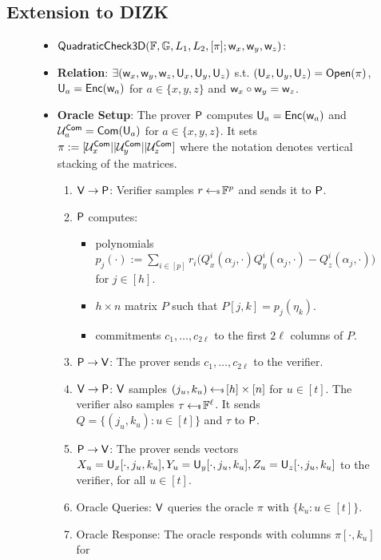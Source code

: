 \subsection{Extension to DIZK}


\begin{figure}[h!]
\centering
\begin{framed}
\begin{itemize}
\item $\mathsf{QuadraticCheck3D}(\mathbb{F},\mathbb{G},L_1,L_2,[\pi];\mathsf{w}_x,\mathsf{w}_y,\mathsf{w}_z)$:
\item {\bf Relation}: $\exists (\mathsf{w}_x,\mathsf{w}_y,\mathsf{w}_z,\mathsf{U}_x,\mathsf{U}_y,\mathsf{U}_z)$
s.t. $(\mathsf{U}_x,\mathsf{U}_y,\mathsf{U}_z)=\mathsf{Open}(\pi)$, $\mathsf{U}_{a}=\mathsf{Enc}(\mathsf{w}_a)$ for $a\in
\{x,y,z\}$ and $\mathsf{w}_x\circ \mathsf{w}_y = \mathsf{w}_z$.
\item {\bf Oracle Setup}: The prover $\mathsf{P}$ computes $\mathsf{U}_a=\mathsf{Enc}(\mathsf{w}_a)$
and $\mathcal{U}^{\mathsf{Com}}_a=\mathsf{Com}(\mathsf{U}_a)$ for $a\in \{x,y,z\}$. It sets $\pi :=
[\mathcal{U}^{\mathsf{Com}}_x||\mathcal{U}^{\mathsf{Com}}_y||\mathcal{U}^{\mathsf{Com}}_z]$ where the notation denotes vertical
stacking of the matrices. 
\begin{enumerate}[{\rm 1.}]
\item $\mathsf{V}\rightarrow\mathsf{P}$: Verifier samples $r\hskip2.3pt{\gets\!\!\mbox{\tiny${\$}$\normalsize}}\,\mathbb{F}^p$ and sends
it to $\mathsf{P}$.
\item $\mathsf{P}$ computes:
	\begin{itemize}
	\item polynomials $p_j(\cdot):=\sum_{i\in
[p]}r_i\big(Q^i_x(\alpha_j,\cdot)Q^i_y(\alpha_j,\cdot)-Q^i_z(\alpha_j,\cdot)\big)$
for $j\in [h]$.
	\item $h\times n$ matrix $P$ such that $P[j,k]=p_j(\eta_k)$.
	\item commitments $c_1,\ldots,c_{2\ell}$ to the first $2\ell$ columns of
$P$.
	\end{itemize}
\item $\mathsf{P}\rightarrow\mathsf{V}$: The prover sends $c_1,\ldots,c_{2\ell}$ to
the verifier.
\item $\mathsf{V}\rightarrow\mathsf{P}$: $\mathsf{V}$ samples $(j_u,k_u)\hskip2.3pt{\gets\!\!\mbox{\tiny${\$}$\normalsize}}\,
[h]\times [n]$ for $u\in [t]$. The verifier also samples $\tau\hskip2.3pt{\gets\!\!\mbox{\tiny${\$}$\normalsize}}\,
\mathbb{F}^{\ell}$. It sends $Q=\{(j_u,k_u):u\in [t]\}$ and $\tau$ to $\mathsf{P}$.
\item $\mathsf{P}\rightarrow\mathsf{V}$: The prover sends vectors
$X_u=\mathsf{U}_x[\cdot,j_u,k_u],Y_u=\mathsf{U}_y[\cdot,j_u,k_u],Z_u=\mathsf{U}_z[\cdot,j_u,k_u]$
to the verifier, for all $u\in [t]$.
\item Oracle Queries: $\mathsf{V}$ queries the oracle $\pi$ with $\{k_u: u\in
[t]\}$.
\item Oracle Response: The oracle responds with columns $\pi[\cdot,k_u]$ for

\end{enumerate}
\end{itemize}
\end{framed}
\end{figure}
